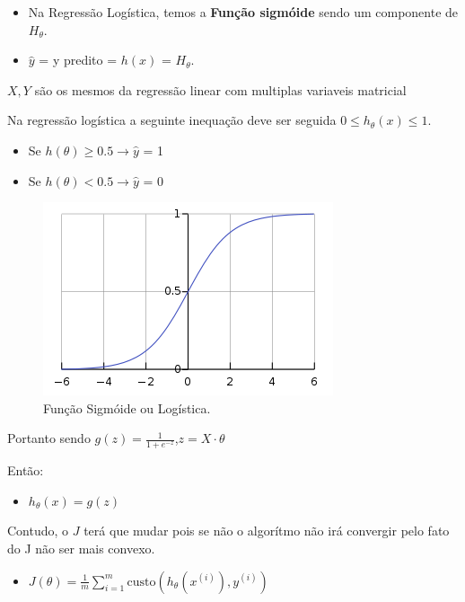 \documentclass[12pt]{article}
\providecommand{\tightlist}{%
      \setlength{\itemsep}{0pt}\setlength{\parskip}{0pt}}
\def\lt{<}
\begin{document}
\begin{itemize}
\item
  Na Regressão Logística, temos a \textbf{Função sigmóide} sendo um
  componente de \(H_{\theta}\).
\item
  \(\hat y\) = y predito = \(h(x)\) = \(H_{\theta}\).
\end{itemize}

\(X,Y\) são os mesmos da regressão linear com multiplas variaveis
matricial

Na regressão logística a seguinte inequação deve ser seguida
\(0 \leq h_\theta(x) \leq 1\).

\begin{itemize}
\item
  Se \(h(\theta) \geq 0.5 \to \hat y\) = 1
\item
  Se \(h(\theta) \lt 0.5 \to \hat y\) = 0
\end{itemize}

\begin{figure}
  \centering
  \includegraphics[width=0.7\linewidth]{imgs/curve-logistic.png}
  \caption{Função Sigmóide ou Logística.}
\end{figure}

Portanto sendo \(g(z)=\frac{1}{1+e^{-z}}\),\(z=X\cdot\theta\)

Então:

\begin{itemize}
\tightlist
\item
  \(h_\theta(x)=g(z)\)
\end{itemize}

Contudo, o \(J\) terá que mudar pois se não o algorítmo não irá
convergir pelo fato do J não ser mais convexo.

\begin{itemize}
\tightlist
\item
  \(J(\theta)=\frac{1}{m}\sum\limits_{i=1}^{m}\text{custo}(h_\theta(x^{(i)}),y^{(i)})\)
\end{itemize}
\end{document}
